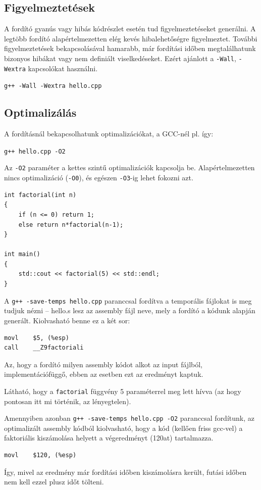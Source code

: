 \documentclass[a4paper,11.5pt,table]{article}
\begin{document}
	\subsection{Figyelmeztetések}

  A fordító gyanús vagy hibás kódrészlet esetén tud figyelmeztetéseket generálni. A legtöbb fordító alapértelmezetten elég kevés hibalehetőségre figyelmeztet. További figyelmeztetések bekapcsolásával hamarabb, már fordítási időben megtalálhatunk bizonyos hibákat vagy nem definiált viselkedéseket. Ezért ajánlott a \texttt{-Wall}, \texttt{-Wextra} kapcsolókat használni.

	{\centering \texttt{g++ -Wall -Wextra hello.cpp} \par}

	\subsection{Optimalizálás}
	A fordításnál bekapcsolhatunk optimalizációkat, a GCC-nél pl. így:
	
	{\centering \texttt{g++ hello.cpp -O2} \par}
	
	Az \texttt{-O2} paraméter a kettes szintű optimalizációk kapcsolja be. Alapértelmezetten nincs optimalizáció (\texttt{-O0}), és egészen \texttt{-O3}-ig lehet fokozni azt.
	\bigskip
	
	\begin{lstlisting}
int factorial(int n)
{
	if (n <= 0) return 1;
	else return n*factorial(n-1);
}

int main()
{
	std::cout << factorial(5) << std::endl;
}
	\end{lstlisting}
	
	A \texttt{g++ -save-temps hello.cpp} paranccsal fordítva a temporális fájlokat is meg tudjuk nézni -- hello.s lesz az assembly fájl neve, mely a fordító a kódunk alapján generált. Kiolvasható benne ez a két sor:
	\begin{lstlisting}[style = customasm]
movl 	$5, (%esp)
call	__Z9factoriali
	\end{lstlisting}
	\begin{note}
		Az, hogy a fordító milyen assembly kódot alkot az input fájlból, implementációfüggő, ebben az esetben ezt az eredményt kaptuk.
	\end{note}
	Látható, hogy a \texttt{factorial} függvény 5 paraméterrel meg lett hívva (az hogy pontosan itt mi történik, az lényegtelen).
	
	\medskip
	Amennyiben azonban \texttt{g++ -save-temps hello.cpp -O2} paranccsal fordítunk, az optimalizált assembly kódból kiolvasható, hogy a kód (kellően friss gcc-vel) a faktoriális kiszámolása helyett a végeredményt (120at) tartalmazza. 
	\begin{lstlisting}[style = customasm]
movl	$120, (%esp)
	\end{lstlisting}
	Így, mivel az eredmény már fordítási időben kiszámolásra került, futási időben nem kell ezzel plusz időt tölteni.
	
\end{document}
